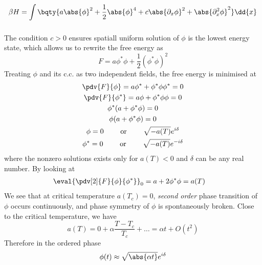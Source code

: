 \documentclass[12pt]{article}
\begin{document}
        \subsection{} \[
            \beta H =\int\bqty{a \abs{\phi}^2 + \frac{1}{2} \abs{\phi}^4 + c \abs{\partial_x \phi}^2 + \abs{\partial_x^2\phi}^2} \dd{x}
        \]
        \subsubsection{} The condition \(c > 0\) ensures spatiall uniform solution of \(\phi\) is the lowest energy state, which allows us to rewrite the free energy as \[
            F = a \phi^*\phi + \frac{1}{2} (\phi^*\phi)^2 
        \]
        Treating \(\phi\) and its c.c. as two independent fields, the free energy is minimised at \begin{gather*}
            \pdv{F}{\phi} = a\phi^* + \phi^*\phi \phi^* = 0\\
            \pdv{F}{\phi^*} = a\phi + \phi^*\phi \phi = 0\\
            \phi^* (a + \phi^*\phi) = 0\\
            \phi (a + \phi^*\phi) = 0\\
            \phi = 0\qquad \text{ or }\qquad \sqrt{-a(T)}e^{i\delta}\\
            \phi^* = 0\qquad \text{ or }\qquad \sqrt{-a(T)}e^{-i\delta}
        \end{gather*}
        where the nonzero solutions exists only for \(a(T) < 0\) and \(\delta\) can be any real number. By looking at \begin{align*}
            \eval{\pdv[2]{F}{\phi}{\phi^*}}_0 &= a + 2\phi^* \phi = a(T)
        \end{align*}
        We see that at critical temperature \(a(T_c) = 0\), \emph{second order} phase transition of \(\phi\) occurs continuously, and phase symmetry of \(\phi\) is spontaneously broken. Close to the critical temperature, we have \[
            a(T) = 0 + \alpha \frac{T - T_c}{T_c} + \dots  = \alpha t + O(t^2)
        \]
        Therefore in the ordered phase \[
            \phi(t) \approx \sqrt{ \abs{\alpha t}} e^{i\delta}
        \]
\end{document}

